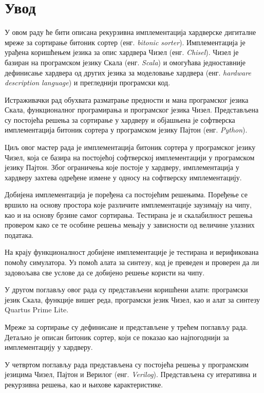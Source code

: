 \documentclass[12pt, a4paper]{article}
\theoremstyle{definition}
\begin{document}
\tableofcontents
\newpage

\section{Увод}
У овом раду ће бити описана рекурзивна имплементација хардверске дигиталне мреже за сортирање битоник сортер (енг. \textit{bitonic sorter}). Имплементација је урађена коришћењем језика за опис хардвера Чизел (енг. \textit{Chisel}). Чизел је базиран на програмском језику Скала (енг. \textit{Scala}) и омогућава једноставније дефинисање хардвера од других језика за моделовање хардвера (енг. \textit{hardware description language}) и прегледнији програмски код.

Истраживачки рад обухвата разматрање предности и мана програмског језика Скала, функционалног програмирања и програмског језика Чизел. Представљена су постојећа решења за сортирање у хардверу и објашњена је софтверска имплементација битоник сортера у програмском језику Пајтон (енг. \textit{Python}).

Циљ овог мастер рада је имплементација битоник сортера у програмског језику Чизел, која се базира на постојећој софтверској имплементацији у програмском језику Пајтон. Због ограничења које постоје у хардверу, имплементација у хардверу захтева одређене измене у односу на софтверску имплементацију.

Добијена имплементација је поређена са постојећим решењима. Поређење се вршило на основу простора које различите имплементације заузимају на чипу, као и на основу брзине самог сортирања. Тестирана је и скалабилност решења провером како се те особине решења мењају у зависности од величине улазних података.


На крају функционалност добијене имплементације је тестирана и верификована помоћу симулатора. Уз помоћ алата за синтезу, код је преведен и проверен да ли задовољава све услове да се добијено решење користи на чипу.

У другом поглављу овог рада су представљени коришћени алати: програмски језик Скала, функције вишег реда, програмски језик Чизел, као и алат за синтезу Quartus Prime Lite.

Мреже за сортирање су дефинисане и представљене у трећем поглављу рада. Детаљно је описан битоник сортер, који се показао као најпогоднији за имплементацију у хардверу.

У четвртом поглављу рада представљена су постојећа решења у програмским језицима Чизел, Пајтон и Верилог (енг. \textit{Verilog}). Представљена су итеративна и рекурзивна решења, као и њихове карактеристике.
\end{document}
